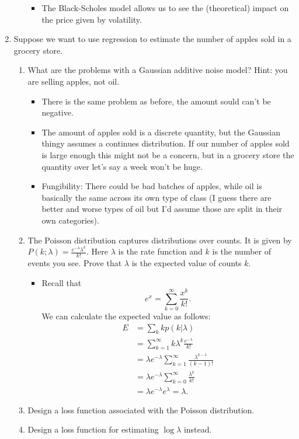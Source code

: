 \documentclass{article}
\begin{document}
\begin{enumerate}[label=\arabic*.]
\begin{enumerate}[label=\arabic*.]
\begin{itemize}
			\item The Black-Scholes model allows us to see the (theoretical) impact on the price given by volatility.
		\end{itemize}
	\end{enumerate}
\item Suppose we want to use regression to estimate the number of apples sold in a grocery store.
	\begin{enumerate}[label=\arabic*.]
	\item What are the problems with a Gaussian additive noise model? Hint: you are selling apples, not oil.
		\begin{itemize}
			\item There is the same problem as before, the amount sould can't be negative.
			\item The amount of apples sold is a discrete quantity, but the Gaussian thingy assumes a continues distribution. If our number of apples sold is large enough this might not be a concern, but in a grocery store the quantity over let's say a week won't be huge.
			\item Fungibility: There could be bad batches of apples, while oil is basically the same across its own type of class (I guess there are better and worse types of oil but I'd assume those are split in their own categories).
		\end{itemize}
	\item The Poisson distribution captures distributions over counts. It is given by $P(k; \lambda) = \frac{e^{-\lambda} \lambda^k}{k!}$. Here $\lambda$ is the rate function and $k$ is the number of events you see. Prove that $\lambda$ is the expected value of counts $k$.
		\begin{itemize}
			\item Recall that
			$$
			e^x = \sum_{k = 0}^\infty \frac{x^k}{k!}.
			$$
			We can calculate the expected value as follows:
			$$
			\begin{aligned}
			E &= \sum_k k p(k|\lambda) \\
			&= \sum_{k = 1}^\infty k \lambda^k \frac{e^{-\lambda}}{k!} \\
			&= \lambda e^{-\lambda} \sum_{k = 1}^\infty \frac{\lambda^{k - 1}}{(k - 1)!}\\
			&= \lambda e^{-\lambda} \sum_{k = 0}^\infty \frac{\lambda^k}{k!} \\
			&= \lambda e^{-\lambda}e^{\lambda} = \lambda.
			\end{aligned}
			$$
		\end{itemize}
	\item Design a loss function associated with the Poisson distribution.
	\item Design a loss function for estimating $\log \lambda$ instead.
	\end{enumerate}
\end{enumerate}
\end{document}
